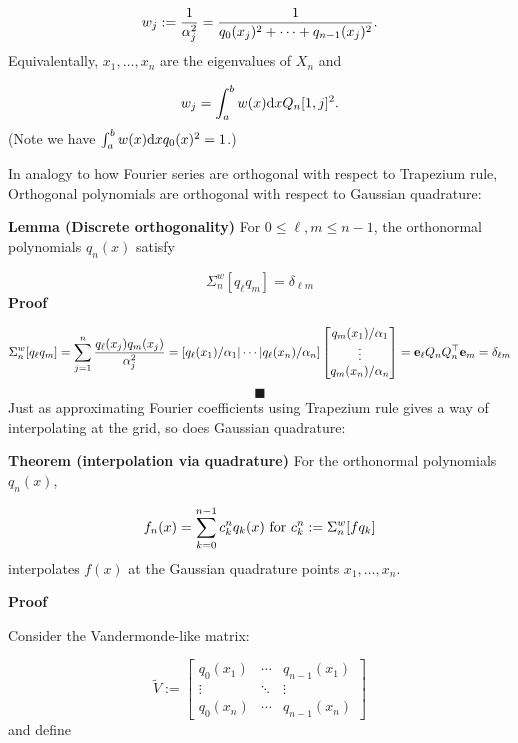 \documentclass[12pt,a4paper]{article}
\begin{document}
\[
w_j := {1 \over \ensuremath{\alpha}_j^2} = {1 \over q_0(x_j)^2 + \ensuremath{\cdots} + q_{n-1}(x_j)^2}.
\]
Equivalentally, $x_1,\ensuremath{\ldots},x_n$ are the eigenvalues of $X_n$ and

\[
w_j = \ensuremath{\int}_a^b w(x) {\rm d}x Q_n[1,j]^2.
\]
(Note we have $\ensuremath{\int}_a^b w(x) {\rm d} x q_0(x)^2 = 1$.)

In analogy to how Fourier series are orthogonal with respect to Trapezium rule, Orthogonal polynomials are orthogonal with respect to Gaussian quadrature:

\textbf{Lemma (Discrete orthogonality)} For $0 \ensuremath{\leq} \ensuremath{\ell},m \ensuremath{\leq} n-1$, the orthonormal polynomials $q_n(x)$ satisfy

\[
\ensuremath{\Sigma}_n^w[q_\ensuremath{\ell} q_m] = \ensuremath{\delta}_{\ensuremath{\ell}m}
\]
\textbf{Proof}

\[
\ensuremath{\Sigma}_n^w[q_\ensuremath{\ell} q_m] = \ensuremath{\sum}_{j=1}^n {q_\ensuremath{\ell}(x_j) q_m(x_j) \over \ensuremath{\alpha}_j^2}
= \left[q_\ensuremath{\ell}(x_1)/ \ensuremath{\alpha}_1 | \ensuremath{\cdots} | {q_\ensuremath{\ell}(x_n)/ \ensuremath{\alpha}_n}\right] 
\begin{bmatrix}
q_m(x_1)/\ensuremath{\alpha}_1 \\
\ensuremath{\vdots} \\
q_m(x_n)/\ensuremath{\alpha}_n \end{bmatrix} = \mathbf{e}_\ensuremath{\ell} Q_n Q_n^\ensuremath{\top} \mathbf{e}_m = \ensuremath{\delta}_{\ensuremath{\ell}m}
\]
\[
\blacksquare
\]
Just as approximating Fourier coefficients using Trapezium rule gives a way of interpolating at the grid, so does Gaussian quadrature:

\textbf{Theorem (interpolation via quadrature)} For the orthonormal polynomials $q_n(x)$,

\[
f_n(x) = \ensuremath{\sum}_{k=0}^{n-1} c_k^n q_k(x)\hbox{ for } c_k^n := \ensuremath{\Sigma}_n^w[f q_k]
\]
interpolates $f(x)$ at the Gaussian quadrature points $x_1,\ensuremath{\ldots},x_n$.

\textbf{Proof}

Consider the Vandermonde-like matrix:

\[
\tilde{V} := \begin{bmatrix} q_0(x_1) & \ensuremath{\cdots} & q_{n-1}(x_1) \\
                \ensuremath{\vdots} & \ensuremath{\ddots} & \ensuremath{\vdots} \\
                q_0(x_n) & \ensuremath{\cdots} & q_{n-1}(x_n) \end{bmatrix}
\]
and define
\end{document}
